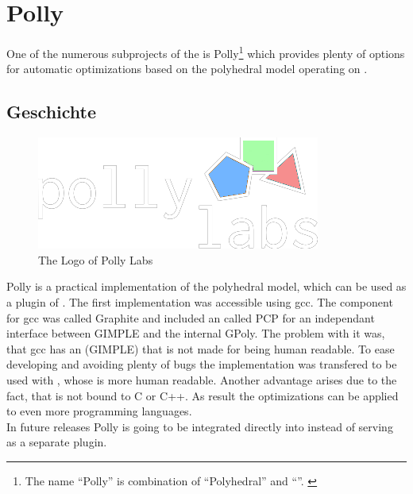 \chapter{Polly}
One of the numerous subprojects of the \llvm is Polly\footnote{The name \enquote{Polly} is combination of \enquote{Polyhedral} and \enquote{\llvm}. \cite{PollyGrosser}} which provides plenty of options for automatic optimizations based on the polyhedral model operating on \llvmir.

\section{Geschichte}
\begin{figure}
    \caption[The logo of Polly Labs]{The Logo of Polly Labs \cite{PollyLabsLogo}}
    \includegraphics[width=.5\textwidth]{gfx/pollylabs.png}
\end{figure}
Polly is a practical implementation of the polyhedral model, which can be used as a plugin of \llvm.
The first implementation was accessible using gcc. The component for gcc was called Graphite and included an \ir called PCP for an independant interface between GIMPLE and the internal \ir GPoly. \cite{GrosserGraphite, gccGimple, gccGraphite} 
The problem with it was, that gcc has an \ir (GIMPLE) that is not made for being human readable.
To ease developing and avoiding plenty of bugs the implementation was transfered to be used with \llvm, whose \ir is more human readable.
Another advantage arises due to the fact, that \llvm is not bound to C or C++.
As result the optimizations can be applied to even more programming languages. \\
In future releases Polly is going to be integrated directly into \llvm instead of serving as a separate plugin.

